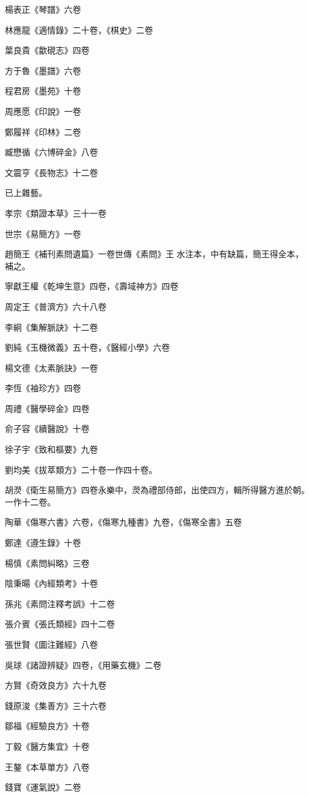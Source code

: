 楊表正《琴譜》六卷

林應龍《適情錄》二十卷，《棋史》二卷

葉良貴《歙硯志》四卷

方于魯《墨譜》六卷

程君房《墨苑》十卷

周應愿《印說》一卷

鄭履祥《印林》二卷

臧懋循《六博碎金》八卷

文震亨《長物志》十二卷

已上雜藝。

孝宗《類證本草》三十一卷

世宗《易簡方》一卷

趙簡王《補刊素問遺篇》一卷世傳《素問》王水注本，中有缺篇，簡王得全本，補之。

寧獻王權《乾坤生意》四卷，《壽域神方》四卷

周定王《普濟方》六十八卷

李絅《集解脈訣》十二卷

劉純《玉機微義》五十卷，《醫經小學》六卷

楊文德《太素脈訣》一卷

李恆《袖珍方》四卷

周禮《醫學碎金》四卷

俞子容《續醫說》十卷

徐子宇《致和樞要》九卷

劉均美《拔萃類方》二十卷一作四十卷。

胡濙《衛生易簡方》四卷永樂中，濙為禮部侍郎，出使四方，輯所得醫方進於朝。一作十二卷。

陶華《傷寒六書》六卷，《傷寒九種書》九卷，《傷寒全書》五卷

鄭達《遵生錄》十卷

楊慎《素問糾略》三卷

陰秉暘《內經類考》十卷

孫兆《素問注釋考誤》十二卷

張介賓《張氏類經》四十二卷

張世賢《圖注難經》八卷

吳球《諸證辨疑》四卷，《用藥玄機》二卷

方賢《奇效良方》六十九卷

錢原浚《集善方》三十六卷

鄒福《經驗良方》十卷

丁毅《醫方集宜》十卷

王鏊《本草單方》八卷

錢寶《運氣說》二卷

